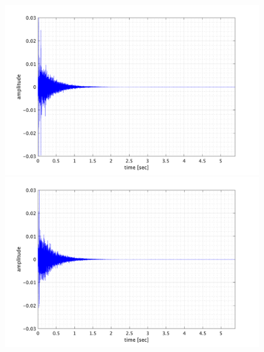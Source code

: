 \documentclass[11pt,a4j]{jreport}
\begin{document}
    \begin{figure}[H]
      \begin{minipage}[b]{.5\linewidth}
          \centering
          \includegraphics[width=.9\linewidth]{images/convolutedIr/REV1.png}
      \end{minipage}%
      \begin{minipage}[b]{.5\linewidth}
          \centering
          \includegraphics[width=.9\linewidth]{images/convolutedIr/REV2.png}
      \end{minipage}


\end{figure}
\end{document}
